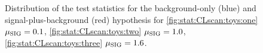 \begin{figure}[h]
\centering 
{}
\caption{
Distribution of the test statistics for the background-only (blue) and signal-plus-background (red) hypothesis for 
\ref{fig:stat:CLscan:toys:one} $\mu_{\rm SIG} = 0.1$,
\ref{fig:stat:CLscan:toys:two} $\mu_{\rm SIG} = 1.0$,
\ref{fig:stat:CLscan:toys:three} $\mu_{\rm SIG} = 1.6$.
}
\label{fig:stat:CLscan}
\end{figure}


